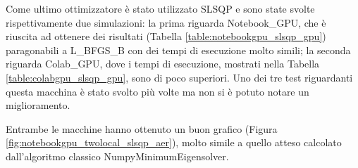 Come ultimo ottimizzatore è stato utilizzato SLSQP e sono state svolte rispettivamente due simulazioni: la prima riguarda Notebook\_GPU, che è riuscita ad ottenere dei risultati (Tabella \ref{table:notebookgpu_slsqp_gpu}) paragonabili a L\_BFGS\_B con dei tempi di esecuzione molto simili; la seconda riguarda Colab\_GPU, dove i tempi di esecuzione, mostrati nella Tabella \ref{table:colabgpu_slsqp_gpu}, sono di poco superiori.
Uno dei tre test riguardanti questa macchina è stato svolto più volte ma non si è potuto notare un miglioramento.

Entrambe le macchine hanno ottenuto un buon grafico (Figura \ref{fig:notebookgpu_twolocal_slsqp_aer}), molto simile a quello atteso calcolato dall'algoritmo classico NumpyMinimumEigensolver.